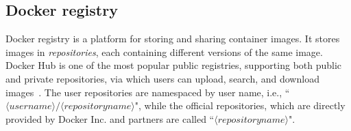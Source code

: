 






\subsection{Docker registry}
\label{sec:docker-registry}

Docker registry is a platform for storing and sharing container
images. It stores images in \emph{repositories}, each containing
different versions of the same image.
%
Docker Hub is one of the most popular public registries,
supporting both public and private repositories,
via which users can upload, search, and download images~\cite{docker-hub}.
%
%
%
%
%
%
The user repositories are namespaced by user name, i.e.,
``$\langle username\rangle/\langle repository name \rangle$",
while the official repositories, which
are directly provided by Docker Inc. and partners are called
``$\langle repository name \rangle$".
%



